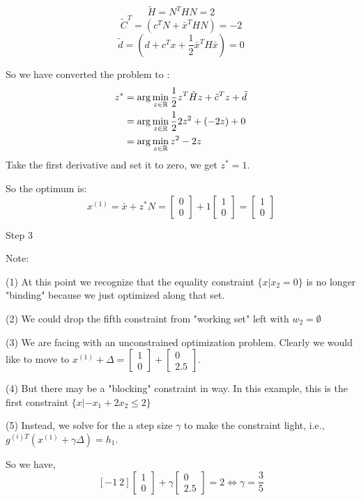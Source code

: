 $$\tilde{H} = N^THN = 2$$
$$\tilde{C}^T = (c^TN + \bar{x}^T HN)= -2$$
$$\tilde{d}= (d+c^Tx + \frac{1}{2}\bar{x}^TH\bar{x})=0$$


So we have converted the problem to :
\begin{align*}
z^* 
&= \arg\min_{z\in\mathbb{R}} \frac{1}{2} z^T\tilde{H}z + \tilde{c}^Tz + \tilde{d}\\
&= \arg\min_{z\in\mathbb{R}} \frac{1}{2}2z^2 + (-2z)+ 0\\
&= \arg\min_{z\in\mathbb{R}} z^2 - 2z
\end{align*}
Take the first derivative and set it to zero, we get $z^* = 1$.

So the optimum is:
\begin{equation*}
x^{(1)}= \bar{x}+ z^*N = 
\begin{bmatrix}
0\\
0
\end{bmatrix}
 + 1
\begin{bmatrix}
1\\
0
\end{bmatrix} = 
\begin{bmatrix}
1\\
0
\end{bmatrix}
\end{equation*}


Step 3

Note:

(1) At this point we recognize that the equality constraint $\{x|x_2=0\}$ is no longer "binding" because we just optimized along that set.

(2) We could drop the fifth constraint from "working set" left with $w_2 =\emptyset$

(3) We are facing with an unconstrained optimization problem. Clearly we would like to move to $x^{(1)} +\Delta = 
\begin{bmatrix}
1\\
0
\end{bmatrix}
+
\begin{bmatrix}
0\\
2.5
\end{bmatrix}
$.

(4) But there may be a "blocking" constraint in way. In this example, this is the first constraint $\{x|-x_1 +2x_2\leq 2 \}$

(5) Instead, we solve for the a step size $\gamma$ to make the constraint light, i.e., $g^{(i)T}(x^{(1)}+\gamma \Delta) = h_1$. 

So we have,
$$[-1\ 2] 
\begin{bmatrix}
1\\
0
\end{bmatrix}
+
\gamma
\begin{bmatrix}
0\\
2.5
\end{bmatrix}
=
2
\Leftrightarrow
\gamma= \frac{3}{5}
$$

